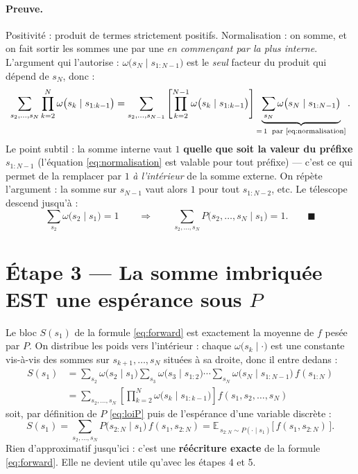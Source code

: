 \documentclass{article}
\newcommand{\pref}[2]{s_{#1:#2}}                     %
\newcommand{\w}[2]{\omega\big(#1 \mid #2\big)}       %
\newcommand{\E}{\mathbb{E}}
\begin{document}
\paragraph{Preuve.} Positivité : produit de termes strictement positifs.
Normalisation : on somme, et on fait sortir les sommes une par une \emph{en
commençant par la plus interne}. L'argument qui l'autorise : $\w{s_N}{\pref{1}{N-1}}$
est le \emph{seul} facteur du produit qui dépend de $s_N$, donc :
\begin{equation}
\sum_{s_2, \ldots, s_N} \prod_{k=2}^{N} \w{s_k}{\pref{1}{k-1}}
= \sum_{s_2, \ldots, s_{N-1}} \left[ \prod_{k=2}^{N-1} \w{s_k}{\pref{1}{k-1}} \right]
  \underbrace{\sum_{s_N} \w{s_N}{\pref{1}{N-1}}}_{=\,1 \;\;\text{par \eqref{eq:normalisation}}}.
\end{equation}
Le point subtil : la somme interne vaut $1$ \textbf{quelle que soit la valeur du
préfixe} $\pref{1}{N-1}$ (l'équation \eqref{eq:normalisation} est valable pour tout
préfixe) --- c'est ce qui permet de la remplacer par $1$ \emph{à l'intérieur} de la
somme externe. On répète l'argument : la somme sur $s_{N-1}$ vaut alors $1$ pour
tout $\pref{1}{N-2}$, etc. Le télescope descend jusqu'à :
\begin{equation}
\sum_{s_2} \w{s_2}{s_1} = 1
\qquad\Longrightarrow\qquad
\sum_{s_2, \ldots, s_N} P\big(s_2,\ldots,s_N \mid s_1\big) = 1. \qquad \blacksquare
\end{equation}

\section{Étape 3 --- La somme imbriquée EST une espérance sous $P$}

Le bloc $S(s_1)$ de la formule \eqref{eq:forward} est exactement la moyenne de $f$
pesée par $P$. On distribue les poids vers l'intérieur : chaque $\w{s_k}{\cdot}$ est
une constante vis-à-vis des sommes sur $s_{k+1},\ldots,s_N$ situées à sa droite,
donc il entre dedans :
\begin{align}
S(s_1)
&= \sum_{s_2} \w{s_2}{s_1} \sum_{s_3} \w{s_3}{\pref{1}{2}} \cdots
   \sum_{s_N} \w{s_N}{\pref{1}{N-1}}\, f(\pref{1}{N}) \\
&= \sum_{s_2, \ldots, s_N} \left[ \prod_{k=2}^{N} \w{s_k}{\pref{1}{k-1}} \right]
   f(s_1, s_2, \ldots, s_N)
\end{align}
soit, par définition de $P$ \eqref{eq:loiP} puis de l'espérance d'une variable
discrète :
\begin{equation}
\boxed{\;
S(s_1)
= \sum_{s_2, \ldots, s_N} P\big(\pref{2}{N} \mid s_1\big)\, f(s_1, \pref{2}{N})
= \E_{\,\pref{2}{N} \sim P(\cdot \mid s_1)}\big[\, f(s_1, \pref{2}{N}) \,\big].
\;}
\label{eq:esperance}
\end{equation}
Rien d'approximatif jusqu'ici : c'est une \textbf{réécriture exacte} de la formule
\eqref{eq:forward}. Elle ne devient utile qu'avec les étapes 4 et 5.
\end{document}
